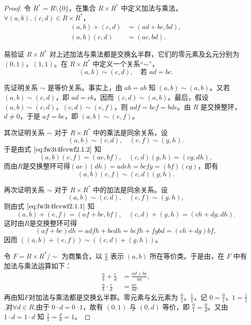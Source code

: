 \documentclass[../../main.tex]{subfiles}%
\begin{document}
\begin{proof}
令 \( R^* = R \setminus \{0\} \)，在集合 \( R \times R^* \) 中定义加法与乘法，\( \forall (a, b), (c, d) \in R \times R^* \)，
\begin{align}
(a, b) + (c, d) &= (ad + bc, bd), \label{eq:fw3t4fevwf2.1.1} \\
(a, b)(c, d) &= (ac, bd). \label{eq:fw3t4fevwf2.1.2}
\end{align}

易验证 \( R \times R^* \) 对上述加法与乘法都是交换幺半群，它们的零元素及幺元分别为 \( (0, 1) \)，\( (1, 1) \)。在 \( R \times R^* \) 中定义一个关系“\( \sim \)”，
\[
(a, b) \sim (c, d), \quad \text{若 } ad = bc.
\]

先证明关系 \( \sim \) 是等价关系。事实上，由 \( ab = ab \) 知 \( (a, b) \sim (a, b) \)。又若 \( (a, b) \sim (c, d) \)，即 \( ad = cb \)，因而 \( (c, d) \sim (a, b) \)。最后，假设 \( (a, b) \sim (c, d) \)，\( (c, d) \sim (e, f) \)，则 \( adf = bcf = bde \)。由 \( R \) 是交换整环，\( d \neq 0 \)，于是 \( af = be \)，即 \( (a, b) \sim (e, f) \)。

其次证明关系 \( \sim \) 对于 \( R \times R^* \) 中的乘法是同余关系，设
\[
(a, b) \sim (c, d), \quad (e, f) \sim (g, h).
\]
于是由式 \(\eqref{eq:fw3t4fevwf2.1.2}\) 知
\[
(a, b)(e, f) = (ae, bf), \quad (c, d)(g, h) = (cg, dh),
\]
而由\( R \)是交换整环可得\( (ae)(dh) = adeh = bcfg = (bf)(cg) \)，即有
\[
(a, b)(e, f) \sim (c, d)(g, h).
\]

再次证明关系 \( \sim \) 对于 \( R \times R^* \) 中的加法是同余关系。设
\[
(a, b) \sim (c, d), \quad (e, f) \sim (g, h),
\]
则由式 \(\eqref{eq:fw3t4fevwf2.1.1}\) 知
\[
(a, b) + (e, f) = (af + be, bf), \quad (c, d) + (g, h) = (ch + dg, dh).
\]
这时由\( R \)是交换整环可得
\[
(af + be)dh = adfh + bedh = bcfh + fgbd = (ch + dg)bf,
\]
因而 \( ((a, b) + (e, f)) \sim ((c, d) + (g, h)) \)。

令 \( F = R \times R^*/\sim \) 为商集合，以 \( \frac{a}{b} \) 表示 \( (a, b) \) 所在等价类。于是由，在 \( F \) 中有加法与乘法运算如下：
\begin{align*}
\frac{a}{b} + \frac{c}{d} &= \frac{ad + bc}{bd}, \\
\frac{a}{b} \cdot \frac{c}{d} &= \frac{ac}{bd}.
\end{align*}
再由知$F$对加法与乘法都是交换幺半群。零元素与幺元素为 \( \frac{0}{1} \)，\( \frac{1}{1} \)，记 \( 0 = \frac{0}{1} \)，\( 1 = \frac{1}{1} \).对$\forall d\in R$,由于 \( 0 \cdot d = 0 \cdot 1 \)，故有 \( (0, 1) \) 与 \( (0, d) \) 等价，即 \( \frac{0}{1} = \frac{0}{d} \)。又由 \( 1 \cdot d = 1 \cdot d \) 知 \( \frac{1}{1} = \frac{d}{d} = 1 \)。


\end{proof}
\end{document}

